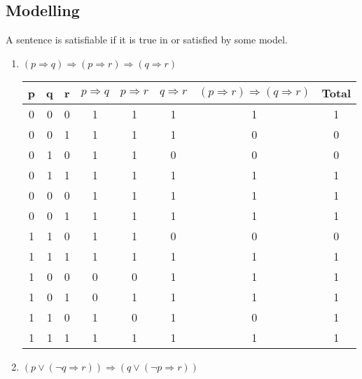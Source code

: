 \subsection{Modelling}
\begin{large}
\raggedright A sentence is satisfiable if it is true in or satisfied by some model.

\begin{enumerate}[label=(\alph*)]
    \item $ (p \Rightarrow q) \Rightarrow (p \Rightarrow r) \Rightarrow ( q \Rightarrow r ) $ \\
    \begin{tabular}{c|c|c|c|c|c|c||c}
        p & q & r & $ p \Rightarrow q $ & $ p \Rightarrow r $ & $ q \Rightarrow r $ &
        $ (p \Rightarrow r) \Rightarrow ( q \Rightarrow r ) $ & Total \\
        \hline\hline
        0 & 0 & 0 & 1 & 1 & 1 & 1 & 1 \\
        \hline
        0 & 0 & 1 & 1 & 1 & 1 & 0 & 0\\
        \hline
        0 & 1 & 0 & 1 & 1 & 0 & 0 & 0 \\
        \hline
        0 & 1 & 1 & 1 & 1 & 1 & 1 & 1 \\
        \hline
        0 & 0 & 0 & 1 & 1 & 1 & 1 & 1 \\
        \hline
        0 & 0 & 1 & 1 & 1 & 1 & 1 & 1 \\
        \hline
        1 & 1 & 0 & 1 & 1 & 0 & 0 & 0 \\
        \hline
        1 & 1 & 1 & 1 & 1 & 1 & 1 & 1 \\
        \hline
        1 & 0 & 0 & 0 & 0 & 1 & 1 & 1 \\
        \hline
        1 & 0 & 1 & 0 & 1 & 1 & 1 & 1 \\
        \hline
        1 & 1 & 0 & 1 & 0 & 1 & 0 & 1 \\
        \hline
        1 & 1 & 1 & 1 & 1 & 1 & 1 & 1 \\
        \hline
    \end{tabular}

    \item $ (p \lor(\neg q \Rightarrow r)) \Rightarrow (q \lor (\neg p \Rightarrow r)) $ \\


\end{enumerate}
\end{large}
